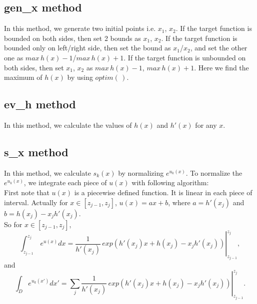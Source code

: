 \documentclass[11pt, oneside]{article}   	%
\begin{document}
\subsection*{ gen\_x method }
In this method, we generate two initial points i.e. $x_{1}$, $x_{2}$.
If the target function is bounded on both sides, then set 2 bounds as $x_{1}$, $x_{2}$.
If the target function is bounded only on left/right side, then set the bound as $x_{1}$/$x_{2}$, and set the other one as $max \, h(x)-1$/$max \,  h(x)+1$.
If the target function is unbounded on both sides, then set $x_{1}$, $x_{2}$ as $max\,  h(x)-1$, $max \, h(x)+1$.
Here we find the maximum of $h(x)$ by using $optim(\, )$.

\subsection*{ ev\_h method }
In this method, we calculate the values of $h(x)$ and $h'(x)$ for any $x$.

\subsection*{ s\_x method }
In this method, we calculate $s_{k}(x)$ by normalizing $e^{ u_{k}(x)}$. To normalize the $e^{ u_{k}(x)}$, we integrate each piece of $u(x)$ with following algorithm: \\
First note that $u(x)$ is a piecewise defined function. It is linear in each piece of interval. Actually for $x \in [z_{j-1}, z_j]$, $u(x) = ax+b $, where $a=h'(x_j)$ and $b=h(x_j)- x_j h'(x_j)$. \\
So for $x \in [z_{j-1}, z_j]$, 
\begin{displaymath}
\int_{z_{j-1}}^{z_j} \, e^{u(x)} dx =\left. \frac{1}{h'(x_j)} \, exp( h'(x_j)x + h(x_j) -x_j h'(x_j))  \right|_{z_{j-1}}^{z_j},
\end{displaymath}
and
\begin{displaymath}
\int_D e^{u_k(x')} dx' = \left.\sum_j \frac{1}{h'(x_j)} \,exp( h'(x_j)x + h(x_j) -x_j h'(x_j))  \right|_{z_{j-1}}^{z_j}.
\end{displaymath}
\end{document}
